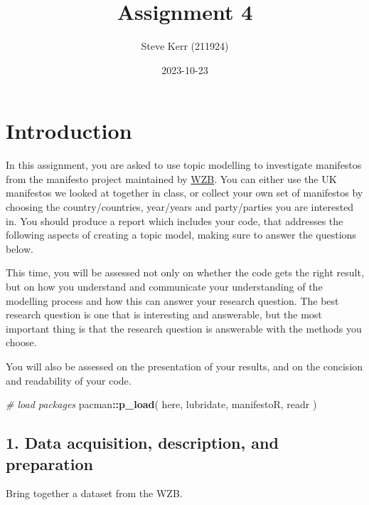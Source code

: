 \documentclass[
]{article}
\title{Assignment 4}
\author{Steve Kerr (211924)}
\date{2023-10-23}
\newenvironment{Shaded}{\begin{snugshade}}{\end{snugshade}}
\newcommand{\CommentTok}[1]{\textcolor[rgb]{0.56,0.35,0.01}{\textit{#1}}}
\newcommand{\FunctionTok}[1]{\textcolor[rgb]{0.13,0.29,0.53}{\textbf{#1}}}
\newcommand{\NormalTok}[1]{#1}
\newcommand{\SpecialCharTok}[1]{\textcolor[rgb]{0.81,0.36,0.00}{\textbf{#1}}}
\begin{document}
\maketitle

\hypertarget{introduction}{%
\section{Introduction}\label{introduction}}

In this assignment, you are asked to use topic modelling to investigate
manifestos from the manifesto project maintained by
\href{https://manifesto-project.wzb.eu/}{WZB}. You can either use the UK
manifestos we looked at together in class, or collect your own set of
manifestos by choosing the country/countries, year/years and
party/parties you are interested in. You should produce a report which
includes your code, that addresses the following aspects of creating a
topic model, making sure to answer the questions below.

This time, you will be assessed not only on whether the code gets the
right result, but on how you understand and communicate your
understanding of the modelling process and how this can answer your
research question. The best research question is one that is interesting
and answerable, but the most important thing is that the research
question is answerable with the methods you choose.

You will also be assessed on the presentation of your results, and on
the concision and readability of your code.

\begin{Shaded}
\begin{Highlighting}[]
\CommentTok{\# load packages}
\NormalTok{pacman}\SpecialCharTok{::}\FunctionTok{p\_load}\NormalTok{(}
\NormalTok{  here,}
\NormalTok{  lubridate,}
\NormalTok{  manifestoR,}
\NormalTok{  readr}
\NormalTok{  )}
\end{Highlighting}
\end{Shaded}

\hypertarget{data-acquisition-description-and-preparation}{%
\subsection{1. Data acquisition, description, and
preparation}\label{data-acquisition-description-and-preparation}}

Bring together a dataset from the WZB.
\end{document}
